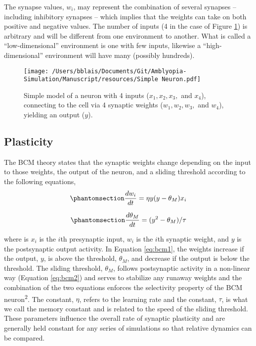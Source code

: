 \documentclass[
]{article}
\begin{document}
The synapse values, \(w_i\), may represent the combination of several
synapses -- including inhibitory synapses -- which implies that the
weights can take on both positive and negative values. The number of
inputs (4 in the case of Figure \ref{fig:simple_neuron}) is arbitrary
and will be different from one environment to another. What is called a
``low-dimensional'' environment is one with few inputs, likewise a
``high-dimensional'' environment will have many (possibly hundreds).

\begin{figure}
\centering
\texttt{[image: /Users/bblais/Documents/Git/Amblyopia-Simulation/Manuscript/resources/Simple Neuron.pdf]}
\caption{Simple model of a neuron with 4 inputs (\(x_1, x_2, x_3,\) and
\(x_4\)), connecting to the cell via 4 synaptic weights
(\(w_1, w_2, w_3,\) and \(w_4\)), yielding an output
(\(y\)).}\label{fig:simple_neuron}
\end{figure}

\subsection{Plasticity}\label{sec:plasticity}

The BCM theory states that the synaptic weights change depending on the
input to those weights, the output of the neuron, and a sliding
threshold according to the following equations,
\begin{equation}\phantomsection\label{eq:bcm1}{
\frac{dw_i}{dt} = \eta y(y-\theta_M) x_i
}\end{equation}

\begin{equation}\phantomsection\label{eq:bcm2}{
\frac{d\theta_M}{dt} = (y^2-\theta_M)/\tau
}\end{equation}

where is \(x_i\) is the \(i\)th presynaptic input, \(w_i\) is the
\(i\)th synaptic weight, and \(y\) is the postsynaptic output activity.
In Equation \ref{eq:bcm1}, the weights increase if the output, \(y\), is
above the threshold, \(\theta_M\), and decrease if the output is below
the threshold. The sliding threshold, \(\theta_M\), follows postsynaptic
activity in a non-linear way (Equation \ref{eq:bcm2}) and serves to
stabilize any runaway weights and the combination of the two equations
enforces the selectivity property of the BCM neuron\textsuperscript{2}.
The constant, \(\eta\), refers to the learning rate and the constant,
\(\tau\), is what we call the memory constant and is related to the
speed of the sliding threshold. These parameters influence the overall
rate of synaptic plasticity and are generally held constant for any
series of simulations so that relative dynamics can be compared.
\end{document}
